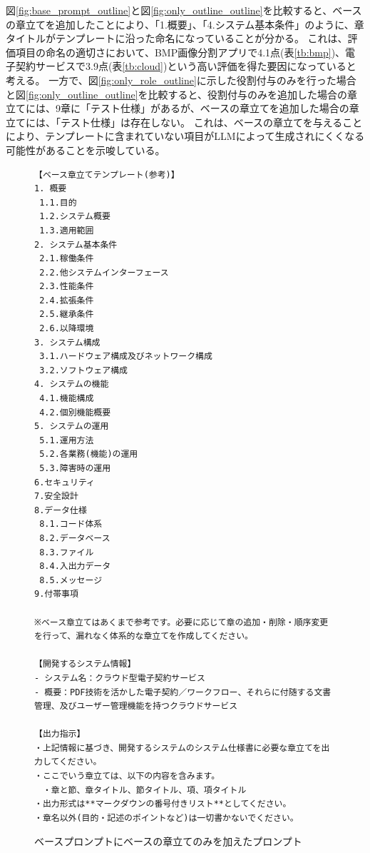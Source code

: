 図\ref{fig:base_prompt_outline}と図\ref{fig:only_outline_outline}を比較すると、ベースの章立てを追加したことにより、「1.概要」、「4.システム基本条件」のように、章タイトルがテンプレートに沿った命名になっていることが分かる。
これは、評価項目の命名の適切さにおいて、BMP画像分割アプリで4.1点(表\ref{tb:bmp})、電子契約サービスで3.9点(表\ref{tb:cloud})という高い評価を得た要因になっていると考える。
一方で、図\ref{fig:only_role_outline}に示した役割付与のみを行った場合と図\ref{fig:only_outline_outline}を比較すると、役割付与のみを追加した場合の章立てには、9章に「テスト仕様」があるが、ベースの章立てを追加した場合の章立てには、「テスト仕様」は存在しない。
これは、ベースの章立てを与えることにより、テンプレートに含まれていない項目がLLMによって生成されにくくなる可能性があることを示唆している。

\begin{figure}[tp]
\begin{tcolorbox}[
  colback=white,
  colframe=blue,
  fonttitle=\bfseries
]
\footnotesize
\ttfamily
\fontsize{8}{9}\selectfont
\begin{verbatim}
【ベース章立てテンプレート(参考)】
1. 概要
 1.1.目的
 1.2.システム概要
 1.3.適用範囲
2. システム基本条件
 2.1.稼働条件
 2.2.他システムインターフェース
 2.3.性能条件
 2.4.拡張条件
 2.5.継承条件
 2.6.以降環境
3. システム構成
 3.1.ハードウェア構成及びネットワーク構成
 3.2.ソフトウェア構成
4. システムの機能
 4.1.機能構成
 4.2.個別機能概要
5. システムの運用
 5.1.運用方法
 5.2.各業務(機能)の運用
 5.3.障害時の運用
6.セキュリティ
7.安全設計
8.データ仕様
 8.1.コード体系
 8.2.データベース
 8.3.ファイル
 8.4.入出力データ
 8.5.メッセージ
9.付帯事項

※ベース章立てはあくまで参考です。必要に応じて章の追加・削除・順序変更を行って、漏れなく体系的な章立てを作成してください。

【開発するシステム情報】
- システム名：クラウド型電子契約サービス
- 概要：PDF技術を活かした電子契約／ワークフロー、それらに付随する文書管理、及びユーザー管理機能を持つクラウドサービス

【出力指示】
・上記情報に基づき、開発するシステムのシステム仕様書に必要な章立てを出力してください。
・ここでいう章立ては、以下の内容を含みます。
　・章と節、章タイトル、節タイトル、項、項タイトル 
・出力形式は**マークダウンの番号付きリスト**としてください。 
・章名以外(目的・記述のポイントなど)は一切書かないでください。

\end{verbatim}
\end{tcolorbox}
\caption{ベースプロンプトにベースの章立てのみを加えたプロンプト}
\label{fig:only_outline}
\end{figure}

